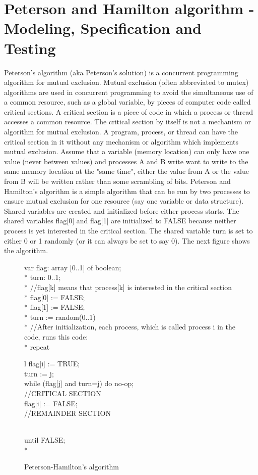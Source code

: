 \section{Peterson and Hamilton algorithm - Modeling,  Specification and Testing}


Peterson's algorithm (aka Peterson's solution) is a concurrent programming algorithm for mutual exclusion. Mutual exclusion (often abbreviated to mutex) algorithms are used in concurrent programming to avoid the simultaneous use of a common resource, such as a global variable, by pieces of computer code called critical sections. A critical section is a piece of code in which a process or thread accesses a common resource. The critical section by itself is not a mechanism or algorithm for mutual exclusion. A program, process, or thread can have the critical section in it without any mechanism or algorithm which implements mutual exclusion. Assume that a variable (memory location) can only have one value (never between values) and processes A and B write want to write to the same memory location at the "same time", either the value from A or the value from B will be written rather than some scrambling of bits. Peterson and Hamilton's algorithm is a simple algorithm that can be run by two processes to ensure mutual exclusion for one resource (say one variable or data structure). Shared variables are created and initialized before either process starts. The shared variables flag[0] and flag[1] are initialized to FALSE because neither process is yet interested in the critical section. The shared variable turn is set to either 0 or 1 randomly (or it can always be set to say 0). The next figure shows the algorithm.

\begin{figure}[h!]
var flag: array [0..1] of boolean; \\*
turn: 0..1; \\*
//flag[k] means that process[k] is interested in the critical section \\*
flag[0] := FALSE; \\*
flag[1] := FALSE; \\*
turn := random(0..1) \\*
//After initialization, each process, which is called process i in the code, runs this code: \\*
repeat \\
\begin{tabular} l
 flag[i] := TRUE; \\*
 turn := j; \\*
 while (flag[j] and turn=j) do no-op; \\*
 //CRITICAL SECTION \\*
 flag[i] := FALSE; \\*
 //REMAINDER SECTION \\*
\end{tabular} \\
until FALSE;\\*
\caption{Peterson-Hamilton's algorithm}
\label{fig:model1}
\end{figure}

